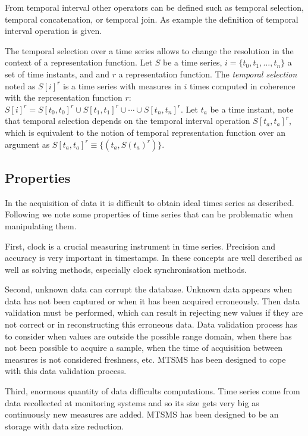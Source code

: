 From temporal interval other operators can be defined such as temporal
selection, temporal concatenation, or temporal join. As example the
definition of temporal interval operation is given.


The temporal selection over a time series allows to change the
resolution in the context of a representation function.  Let $S$ be a
time series, $i=\{t_0,t_1,\dotsc,t_n\}$ a set of time instants, and
and $r$ a representation function. The \emph{temporal selection} noted
as $S[i]^r$ is a time series with measures in $i$ times computed in
coherence with the representation function $r$: $S[i]^r = S[t_0,t_0]^r
\cup S[t_1,t_1]^r \cup \dotsb \cup S[t_n,t_n]^r$. Let $t_a$ be a time
instant, note that temporal selection depends on the temporal interval
operation $S[t_a,t_a]^r$, which is equivalent to the notion of
temporal representation function over an argument as $S[t_a,t_a]^r
\equiv \{ (t_a, S(t_a)^r) \}$.





\subsection{Properties}
\label{sec:model:properties} 

In the acquisition of data it is difficult to obtain ideal times
series as described. Following we note some properties of time series
that can be problematic when manipulating them.

First, clock is a crucial measuring instrument in time
series. Precision and accuracy is very important in timestamps.  In
\cite{kopetz11:realtime} these concepts are well described as well as
solving methods, especially clock synchronisation methods.


Second, unknown data can corrupt the database. Unknown data appears
when data has not been captured or when it has been acquired
erroneously. Then data validation must be performed, which can result
in rejecting new values if they are not correct or in reconstructing
this erroneous data.  Data validation process has to consider when
values are outside the possible range domain, when there has not been
possible to acquire a sample, when the time of acquisition between
measures is not considered freshness, etc. MTSMS has been designed to
cope with this data validation process.


Third, enormous quantity of data difficults computations.  Time series
come from data recollected at monitoring systems and so its size gets
very big as continuously new measures are added.  MTSMS has been designed to 
be an storage with data size reduction.


